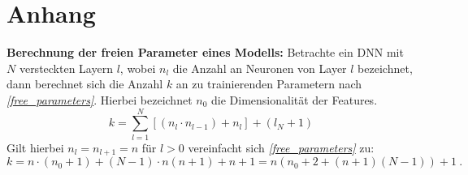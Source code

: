\chapter{Anhang}
\textbf{Berechnung der freien Parameter eines Modells:} \label{freie parameter} Betrachte ein DNN mit $N$ versteckten Layern $l$, wobei $n_l$ die Anzahl an Neuronen von Layer $l$ bezeichnet, dann berechnet sich die Anzahl $k$ an zu trainierenden Parametern nach \textit{\autoref{free_parameters}}. Hierbei bezeichnet $n_0$ die Dimensionalität der Features.
\begin{equation}
	k = \sum_{l=1}^{N} \left[(n_l \cdot n_{l-1}) + n_l\right] + (l_N + 1)
	\label{free_parameters}
\end{equation}
Gilt hierbei $n_l = n_{l+1} = n$ für $l > 0$ vereinfacht sich \textit{\autoref{free_parameters}} zu:
\begin{equation}
	k = n \cdot (n_0 + 1) + (N-1)\cdot n(n+1) + n + 1 = n \left(n_0 + 2 + (n + 1)(N-1)\right) + 1~.
\end{equation}
